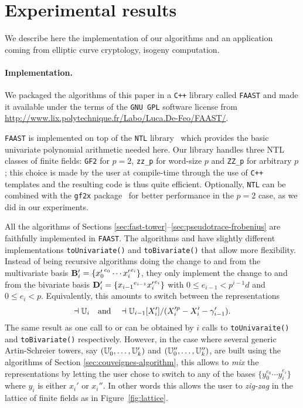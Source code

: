 \section{Experimental results}
\label{sec:benchmarks}

We describe here the implementation of our algorithms and an
application coming from elliptic curve cryptology, isogeny
computation.

\paragraph*{\bf Implementation.} We packaged the algorithms of this
paper in a \texttt{C++} library called \texttt{FAAST} and made it
available under the terms of the \texttt{GNU GPL} software license
from
\mbox{\url{http://www.lix.polytechnique.fr/Labo/Luca.De-Feo/FAAST/}}.

\texttt{FAAST} is implemented on top of the \texttt{NTL}
library~\cite{NTL} which provides the basic univariate polynomial
arithmetic needed here. Our library handles three NTL classes of
finite fields: {\tt GF2} for $p=2$, {\tt zz\_p} for word-size $p$ and
{\tt ZZ\_p} for arbitrary $p$; this choice is made by the user at
compile-time through the use of \texttt{C++} templates and the
resulting code is thus quite efficient.  Optionally, \texttt{NTL} can
be combined with the \texttt{gf2x} package~\cite{gf2x} for better
performance in the $p=2$ case, as we did in our experiments.

All the algorithms of Sections
\ref{sec:fast-tower}--\ref{sec:pseudotrace-frobenius} are faithfully
implemented in \texttt{FAAST}. The algorithms 
and  have slightly different implementations
\texttt{toUnivariate()} and \texttt{toBivariate()} that allow more
flexibility. Instead of being recursive algorithms doing the change to
and from the multivariate basis $\mathbf{B}'_i=\{{x_0'}^{e_0}\cdots
{x_i'}^{e_i}\}$, they only implement the change to and from the
bivariate basis $\mathbf{D}'_i=\{{x_{i-1}}^{e_{i-1}}{x_i'}^{e_i}\}$ with $0\le
e_{i-1}<p^{i-1}d$ and $0\le e_i<p$. Equivalently, this amounts to
switch between the representations
\begin{equation*}
  \dashv\mathbb{U}_i \quad\text{and}\quad
  \dashv\mathbb{U}_{i-1}[X_i']/(X_i'^p-X_i'-\gamma_{i-1}')
  \text{.}
\end{equation*}
The same result as one call to  or
 can be obtained by $i$ calls to
\texttt{toUnivaraite()} and \texttt{toBivariate()}
respectively. However, in the case where several generic Artin-Schreier
towers, say $(\mathbb{U}_0',\ldots,\mathbb{U}_k')$ and $(\mathbb{U}_0'',\ldots,\mathbb{U}_k'')$, are
built using the algorithms of Section \ref{sec:couveignes-algorithm},
this allows to \emph{mix} the representations by letting the user
chose to switch to any of the bases $\{y_0^{e_0}\cdots y_i^{e_i}\}$
where $y_i$ is either $x_i'$ or $x_i''$. In other words this allows
the user to \emph{zig-zag} in the lattice of finite fields as in
Figure~\ref{fig:lattice}.

